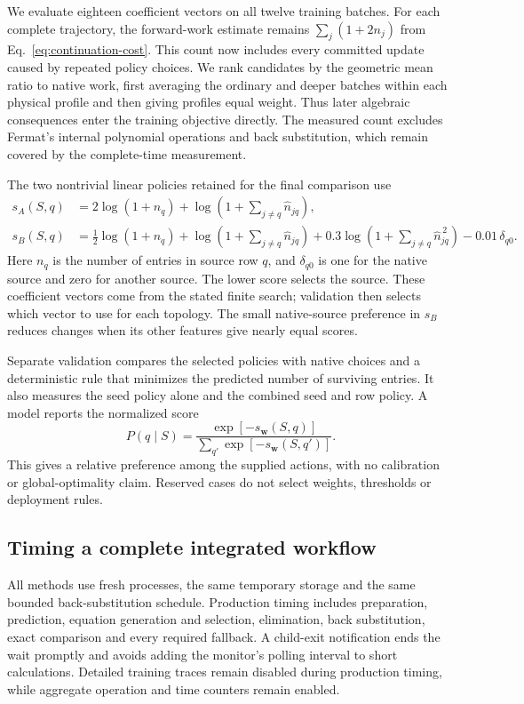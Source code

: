 We evaluate eighteen coefficient vectors on all twelve training batches.
For each complete trajectory, the forward-work estimate remains
$\sum_j(1+2n_j)$ from Eq.~\eqref{eq:continuation-cost}. This count now includes
every committed update caused by repeated policy choices. We rank candidates
by the geometric mean ratio to native work, first averaging the ordinary and
deeper batches within each physical profile and then giving profiles equal
weight. Thus later algebraic consequences enter the training objective directly.
The measured count excludes Fermat's internal polynomial operations and
back substitution, which remain covered by the complete-time measurement.


The two nontrivial linear policies retained for the final comparison use
\begin{align}
 s_A(S,q)&=
 2\log(1+n_q)+
 \log\!\left(1+\sum_{j\ne q}\widehat n_{jq}\right),\\
 s_B(S,q)&=
 \tfrac12\log(1+n_q)+
 \log\!\left(1+\sum_{j\ne q}\widehat n_{jq}\right)
 +0.3\log\!\left(1+\sum_{j\ne q}\widehat n_{jq}^{\,2}\right)
 -0.01\,\delta_{q0}.
\end{align}
Here $n_q$ is the number of entries in source row $q$, and
$\delta_{q0}$ is one for the native source and zero for another source.
The lower score selects the source. These coefficient vectors come from
the stated finite search; validation then selects which vector to use for
each topology. The small native-source preference in $s_B$ reduces changes
when its other features give nearly equal scores.

Separate validation compares the selected policies with native choices and
a deterministic rule that minimizes the predicted number of surviving entries.
It also measures the seed policy alone and the combined seed and row policy.
A model reports the normalized score
\[
 P(q\mid S)=
 \frac{\exp[-s_{\boldsymbol w}(S,q)]}
 {\sum_{q'}\exp[-s_{\boldsymbol w}(S,q')]}.
\]
This gives a relative preference among the supplied actions, with no
calibration or global-optimality claim. Reserved cases do not select weights,
thresholds or deployment rules.

\subsection{Timing a complete integrated workflow}
All methods use fresh processes, the same temporary storage and the same
bounded back-substitution schedule. Production timing includes preparation,
prediction, equation generation and selection, elimination, back substitution,
exact comparison and every required fallback. A child-exit notification ends
the wait promptly and avoids adding the monitor's polling interval to short
calculations. Detailed training traces remain disabled during production
timing, while aggregate operation and time counters remain enabled.

